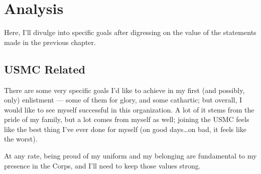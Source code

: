 \chapter{Analysis}

Here, I'll divulge into specific goals after digressing on the value of the statements
made in the previous chapter.

\section{USMC Related}

There are some very specific goals I'd like to achieve in my first (and possibly, only)
enlistment --- some of them for glory, and some cathartic; but overall, I would like to
see myself successful in this organization. A lot of it stems from the pride of my
family, but a lot comes from myself as well; joining the USMC feels like the best thing
I've ever done for myself (on good days\ldots on bad, it feels like the worst).

At any rate, being proud of my uniform and my belonging are fundamental
to my presence in the Corps, and I'll need to keep those values strong.


